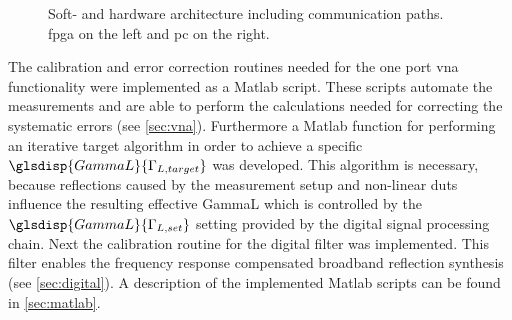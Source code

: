 \documentclass[12pt,a4paper,parskip=full,abstract=true,BCOR=12mm,twoside,open=right]{scrreprt}
\makeatletter
\newcommand\currentcoordinate{\the\tikz@lastxsaved,\the\tikz@lastysaved}
\makeatother
\begin{document}
\begin{figure}[htb]
    \caption{Soft- and hardware architecture including communication paths. \gls{fpga} on the left and \gls{pc} on the right.}
    \label{fig:architecture}
\end{figure}

The calibration and error correction routines needed for the one port
\gls{vna} functionality were implemented as a Matlab script. These scripts
automate the measurements and are able to perform the calculations
needed for correcting the systematic errors (see \cref{sec:vna}). Furthermore
a Matlab function for performing an iterative target algorithm in order to
achieve a specific $\glsdisp{GammaL}{\Gamma_{L,target}}$ was developed. This algorithm
is necessary, because reflections caused by the measurement setup and
non-linear \glspl{dut} influence the resulting effective \gls{GammaL} which is controlled by the
$\glsdisp{GammaL}{\Gamma_{L,set}}$ setting provided by the digital signal
processing chain. Next the calibration routine for the digital filter was
implemented. This filter enables the frequency response compensated broadband
reflection synthesis (see \cref{sec:digital}). A description
of the implemented Matlab scripts can be found in \cref{sec:matlab}.
\end{document}
